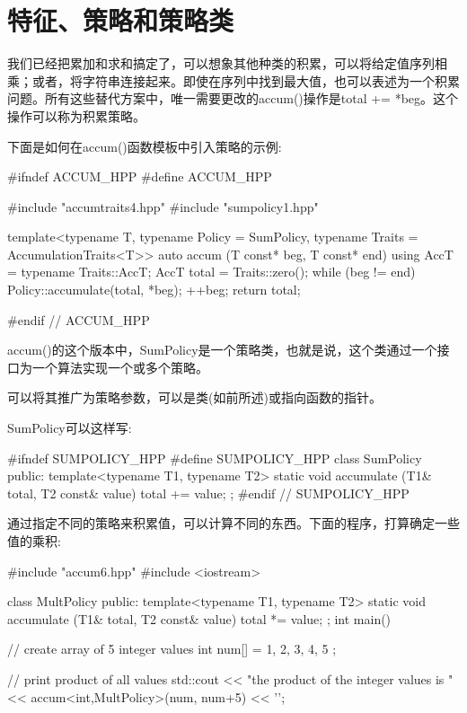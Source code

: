 \section{特征、策略和策略类}

我们已经把累加和求和搞定了，可以想象其他种类的积累，可以将给定值序列相乘；或者，将字符串连接起来。即使在序列中找到最大值，也可以表述为一个积累问题。所有这些替代方案中，唯一需要更改的accum()操作是total += *beg。这个操作可以称为积累策略。

下面是如何在accum()函数模板中引入策略的示例:

\begin{cpp}
#ifndef ACCUM_HPP
#define ACCUM_HPP

#include "accumtraits4.hpp"
#include "sumpolicy1.hpp"

template<typename T,
		typename Policy = SumPolicy,
		typename Traits = AccumulationTraits<T>>
auto accum (T const* beg, T const* end)
{
	using AccT = typename Traits::AccT;
	AccT total = Traits::zero();
	while (beg != end) {
		Policy::accumulate(total, *beg);
		++beg;
	}
	return total;
}

#endif // ACCUM_HPP
\end{cpp}

accum()的这个版本中，SumPolicy是一个策略类，也就是说，这个类通过一个接口为一个算法实现一个或多个策略。

\begin{notice}
可以将其推广为策略参数，可以是类(如前所述)或指向函数的指针。
\end{notice}

SumPolicy可以这样写:

\begin{cpp}
#ifndef SUMPOLICY_HPP
#define SUMPOLICY_HPP
class SumPolicy {
	public:
	template<typename T1, typename T2>
	static void accumulate (T1& total, T2 const& value) {
		total += value;
	}
};
#endif // SUMPOLICY_HPP
\end{cpp}

通过指定不同的策略来积累值，可以计算不同的东西。下面的程序，打算确定一些值的乘积:

\begin{cpp}
#include "accum6.hpp"
#include <iostream>

class MultPolicy {
	public:
	template<typename T1, typename T2>
	static void accumulate (T1& total, T2 const& value) {
		total *= value;
	}
};
int main()
{
	// create array of 5 integer values
	int num[] = { 1, 2, 3, 4, 5 };
	
	// print product of all values
	std::cout << "the product of the integer values is "
			<< accum<int,MultPolicy>(num, num+5)
			<< '\n';
}
\end{cpp}

